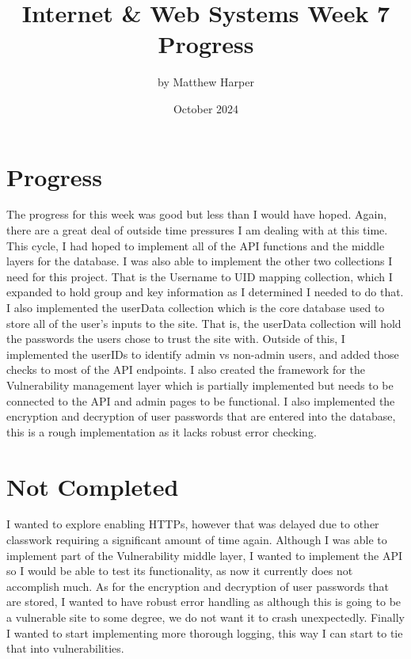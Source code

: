 \documentclass{article}
\title{Internet \& Web Systems Week 7 Progress}
\author{by Matthew Harper }
\date{October 2024}
\begin{document}
\maketitle
\section{Progress}
The progress for this week was good but less than I would have hoped. Again, there are a great deal of outside time pressures I am dealing with at this time.
This cycle, I had hoped to implement all of the API functions and the middle layers for the database. I was also able to implement the other two collections
I need for this project. That is the Username to UID mapping collection, which I expanded to hold group and key information as I determined I needed to do that. 
I also implemented the userData collection which is the core database used to store all of the user's inputs to the site. That is, the userData collection will
hold the passwords the users chose to trust the site with. Outside of this, I implemented the userIDs to identify admin vs non-admin users, and added those checks
to most of the API endpoints. I also created the framework for the Vulnerability management layer which is partially implemented but needs to be connected to the
API and admin pages to be functional. I also implemented the encryption and decryption of user passwords that are entered into the database, this is a rough
implementation as it lacks robust error checking.

\section{Not Completed}
I wanted to explore enabling HTTPs, however that was delayed due to other classwork requiring a significant amount of time again. Although I was able to implement
part of the Vulnerability middle layer, I wanted to implement the API so I would be able to test its functionality, as now it currently does not accomplish much.
As for the encryption and decryption of user passwords that are stored, I wanted to have robust error handling as although this is going to be a vulnerable site
to some degree, we do not want it to crash unexpectedly. Finally I wanted to start implementing more thorough logging, this way I can start to tie that into vulnerabilities.
\end{document}
